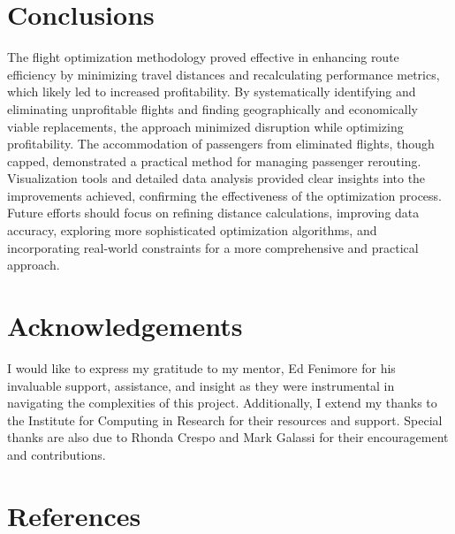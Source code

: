 \documentclass{article}
\begin{document}
\section{Conclusions}

The flight optimization methodology proved effective in enhancing route efficiency by minimizing travel distances and recalculating performance metrics, which likely led to increased profitability. By systematically identifying and eliminating unprofitable flights and finding geographically and economically viable replacements, the approach minimized disruption while optimizing profitability. The accommodation of passengers from eliminated flights, though capped, demonstrated a practical method for managing passenger rerouting. Visualization tools and detailed data analysis provided clear insights into the improvements achieved, confirming the effectiveness of the optimization process. Future efforts should focus on refining distance calculations, improving data accuracy, exploring more sophisticated optimization algorithms, and incorporating real-world constraints for a more comprehensive and practical approach.

\section*{Acknowledgements}

I would like to express my gratitude to my mentor, Ed Fenimore for his invaluable support, assistance, and insight as they were instrumental in navigating the complexities of this project. Additionally, I extend my thanks to the Institute for Computing in Research for their resources and support. Special thanks are also due to Rhonda Crespo and Mark Galassi for their encouragement and contributions.

\newpage

\section*{\centering References}
\end{document}
